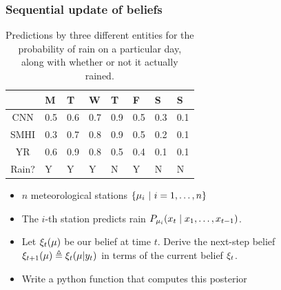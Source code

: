 \begin{frame}
  \frametitle{Sequential update of beliefs}
  {
    \begin{table}[h]
      \begin{tabular}{c|l|l|l|l|l|l|l}
        &M&T&W&T&F&S&S\\
        \hline
        CNN & 0.5 & 0.6 & 0.7 & 0.9 & 0.5 & 0.3 & 0.1\\
        SMHI & 0.3 & 0.7 & 0.8 & 0.9 & 0.5 & 0.2 & 0.1\\
        YR & 0.6 & 0.9 & 0.8 & 0.5 & 0.4 & 0.1 & 0.1\\
        \hline
        Rain? & Y & Y & Y & N & Y & N & N
      \end{tabular}
      \caption{Predictions by three different entities for the probability of rain on a particular day, along with whether or not it actually rained.}
      \label{tab:meteorologists}
    \end{table}
  }
  \begin{exercise}
    \begin{itemize}
    \item $n$ meteorological stations $\left\{\mu_i ~\middle|~ i=1, \ldots,n\right\}$
    \item The $i$-th station predicts rain $P_{\mu_i}(x_t \mid x_1, \ldots, x_{t-1})$.
    \item Let $\xi_t(\mu)$ be our belief at time $t$.
      Derive the next-step belief
      $\xi_{t+1}(\mu) \mathrel{\triangleq}  \xi_t(\mu | y_{t})$ in terms of the current belief $\xi_t$.
    \item Write a python function that computes this posterior
    \end{itemize}
  \end{exercise}
\end{frame}




